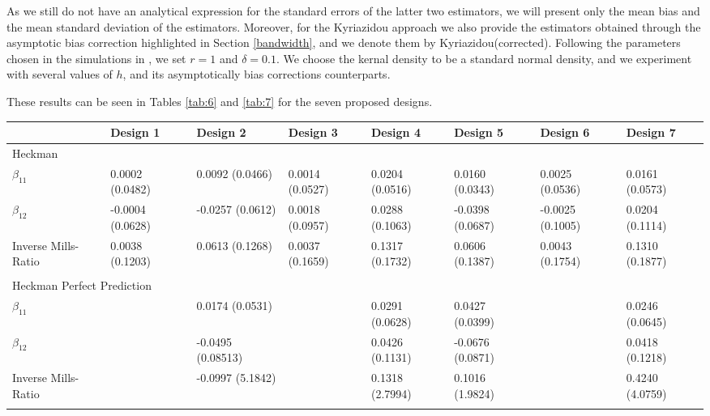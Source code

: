 As we still do not have an analytical expression for the standard errors of the latter two estimators, we will present only the mean bias and the mean standard deviation of the estimators. Moreover, for the Kyriazidou approach we also provide the estimators obtained through the asymptotic bias correction highlighted in Section \ref{bandwidth}, and we denote them by Kyriazidou(corrected). Following the parameters chosen in the simulations in \cite{kyriazidou1997estimation}, we set $r=1$ and $\delta = 0.1$. We choose the kernal density to be a standard normal density, and we experiment with several values of $h$, and its asymptotically bias corrections counterparts.

These results can be seen in Tables \ref{tab:6} and \ref{tab:7} for the seven proposed designs. 

\begin{table}
\begin{adjustwidth}{-.5in}{-.5in}
\vspace{-2.5em}%
\small
\centering
\begin{tabular}{p{3cm}p{1.3cm}p{1.3cm}p{1.3cm}p{1.3cm}p{1.3cm}p{1.3cm}p{1.3cm}}
  \hline
   \quad & Design 1 & Design 2 & Design 3 & Design 4 & Design 5 & Design 6 & Design 7  \\
   \hline
   \multicolumn{8}{l}{Heckman} \\
   \hline
    $\beta_{11}$  & 0.0002 (0.0482) & 0.0092 (0.0466) & 0.0014 (0.0527) & 0.0204 (0.0516) & 0.0160 (0.0343) & 0.0025 (0.0536) & 0.0161 (0.0573) \\
    $\beta_{12}$  & -0.0004 (0.0628) & -0.0257 (0.0612) & 0.0018 (0.0957) &  0.0288 (0.1063)& -0.0398 (0.0687) & -0.0025 (0.1005) & 0.0204 (0.1114) \\
    Inverse Mills-Ratio  & 0.0038 (0.1203)  & 0.0613 (0.1268) & 0.0037 (0.1659) & 0.1317 (0.1732) & 0.0606 (0.1387) & 0.0043 (0.1754) & 0.1310 (0.1877) \\
     & & & & & & & \\
    \hline
    \multicolumn{8}{l}{Heckman Perfect Prediction} \\
    \hline
     $\beta_{11}$  & & 0.0174 (0.0531) &  & 0.0291 (0.0628) & 0.0427 (0.0399) &  & 0.0246 (0.0645)\\
     $\beta_{12}$  & & -0.0495 (0.08513) &  & 0.0426 (0.1131)& -0.0676 (0.0871) &  & 0.0418 (0.1218)\\
     Inverse Mills-Ratio  & & -0.0997 (5.1842)&  & 0.1318 (2.7994) & 0.1016 (1.9824) &  & 0.4240 (4.0759)\\
      & & & & & & & \\

\end{tabular}
\end{adjustwidth}
\end{table}
